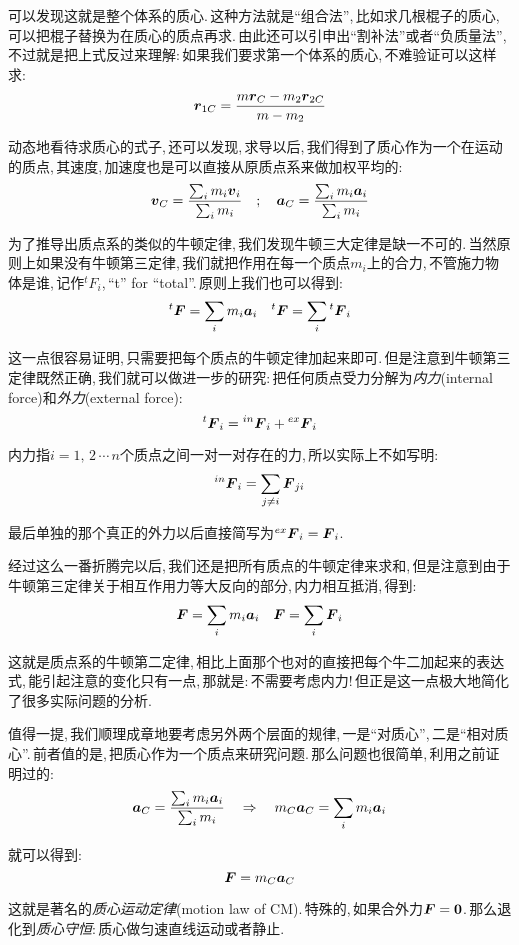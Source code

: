 可以发现这就是整个体系的质心.\,这种方法就是``组合法'',\,比如求几根棍子的质心,\,可以把棍子替换为在质心的质点再求.\,由此还可以引申出``割补法''或者``负质量法'',\,不过就是把上式反过来理解:\,如果我们要求第一个体系的质心,\,不难验证可以这样求:
\[\boldsymbol{r}_{1C}=\frac{m\boldsymbol{r}_C-m_2\boldsymbol{r}_{2C}}{m-m_2}\]

动态地看待求质心的式子,\,还可以发现,\,求导以后,\,我们得到了质心作为一个在运动的质点,\,其速度,\,加速度也是可以直接从原质点系来做加权平均的:
\[\boldsymbol{v}_C=\frac{\sum_i m_i\boldsymbol{v}_i}{\sum_i m_i}\quad;\quad \boldsymbol{a}_C=\frac{\sum_i m_i\boldsymbol{a}_i}{\sum_i m_i}\]

为了推导出质点系的类似的牛顿定律,\,我们发现牛顿三大定律是缺一不可的.\,当然原则上如果没有牛顿第三定律,\,我们就把作用在每一个质点$m_i$上的合力,\,不管施力物体是谁,\,记作$\phantom{}^tF_i$,\,``t'' for ``total''.\,原则上我们也可以得到:
\[\phantom{}^t\boldsymbol{F}=\sum_i m_i\boldsymbol{a}_i\quad \phantom{}^t\boldsymbol{F}=\sum_i\phantom{}^t\boldsymbol{F}_i\]

这一点很容易证明,\,只需要把每个质点的牛顿定律加起来即可.\,但是注意到牛顿第三定律既然正确,\,我们就可以做进一步的研究:\,把任何质点受力分解为\emph{内力}(internal force)和\emph{外力}(external force):
\[\phantom{}^t\boldsymbol{F}_i=\phantom{}^{in}\boldsymbol{F}_i+\phantom{}^{ex}\boldsymbol{F}_i\]

内力指$i=1,\,2\,\cdots\,n$个质点之间一对一对存在的力,\,所以实际上不如写明:
\[\phantom{}^{in}\boldsymbol{F}_i=\sum_{j\neq i}\boldsymbol{F}_{ji}\]

最后单独的那个真正的外力以后直接简写为$\phantom{}^{ex}\boldsymbol{F}_i=\boldsymbol{F}_i$.

经过这么一番折腾完以后,\,我们还是把所有质点的牛顿定律来求和,\,但是注意到由于牛顿第三定律关于相互作用力等大反向的部分,\,内力相互抵消,\,得到:
\[\boldsymbol{F}=\sum_i m_i\boldsymbol{a}_i\quad \boldsymbol{F}=\sum_i \boldsymbol{F}_i\]

这就是质点系的牛顿第二定律,\,相比上面那个也对的直接把每个牛二加起来的表达式,\,能引起注意的变化只有一点,\,那就是:\,不需要考虑内力!\,但正是这一点极大地简化了很多实际问题的分析.

值得一提,\,我们顺理成章地要考虑另外两个层面的规律,\,一是``对质心'',\,二是``相对质心''.\,前者值的是,\,把质心作为一个质点来研究问题.\,那么问题也很简单,\,利用之前证明过的:
\[\boldsymbol{a}_C=\frac{\sum_i m_i\boldsymbol{a}_i}{\sum_i m_i}\quad \Rightarrow \quad m_C\boldsymbol{a}_C=\sum_i m_i\boldsymbol{a}_i\]

就可以得到:
\[\boldsymbol{F}=m_C\boldsymbol{a}_C\]

这就是著名的\emph{质心运动定律}(motion law of {\rm CM}).\,特殊的,\,如果合外力$\boldsymbol{F}=\boldsymbol{0}$.\,那么退化到\emph{质心守恒}:\,质心做匀速直线运动或者静止.

